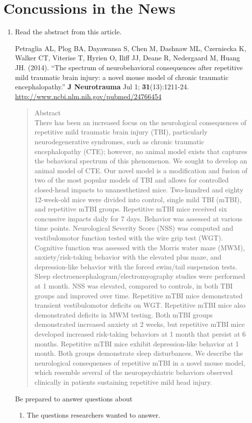 \def\theTopic{Reading 23 }

\section{ Concussions in the News}



\begin{enumerate}
\item   Read the abstract from this  article.

Petraglia AL, Plog BA, Dayawansa S, Chen M, Dashnaw ML, Czerniecka K,
Walker CT, Viterise T, Hyrien O, Iliff JJ, Deane R, Nedergaard M,
Huang JH. (2014). ``The spectrum of neurobehavioral consequences after repetitive mild traumatic brain injury: a novel mouse model of chronic traumatic encephalopathy.''
{\bf J Neurotrauma} Jul 1; {\bf 31}(13):1211-24. 
\url{http://www.ncbi.nlm.nih.gov/pubmed/24766454}
{\footnotesize
\begin{quotation}
Abstract\\
There has been an increased focus on the neurological consequences of
repetitive mild traumatic brain injury (TBI), particularly
neurodegenerative syndromes, such as chronic traumatic encephalopathy
(CTE); however, no animal model exists that captures the behavioral
spectrum of this phenomenon. We sought to develop an animal model of
CTE. Our novel model is a modification and fusion of two of the most
popular models of TBI and allows for controlled closed-head impacts to
unanesthetized mice. Two-hundred and eighty 12-week-old mice were
divided into control, single mild TBI (mTBI), and repetitive mTBI
groups. Repetitive mTBI mice received six concussive impacts daily for
7 days. Behavior was assessed at various time points. Neurological
Severity Score (NSS) was computed and vestibulomotor function tested
with the wire grip test (WGT). Cognitive function was assessed with
the Morris water maze (MWM), anxiety/risk-taking behavior with the
elevated plus maze, and depression-like behavior with the forced
swim/tail suspension tests. Sleep
electroencephalogram/electromyography studies were performed at 1
month. NSS was elevated, compared to controls, in both TBI groups and
improved over time. Repetitive mTBI mice demonstrated transient
vestibulomotor deficits on WGT. Repetitive mTBI mice also demonstrated
deficits in MWM testing. Both mTBI groups demonstrated increased
anxiety at 2 weeks, but repetitive mTBI mice developed increased
risk-taking behaviors at 1 month that persist at 6 months. Repetitive
mTBI mice exhibit depression-like behavior at 1 month. Both groups
demonstrate sleep disturbances. We describe the neurological consequenses
of repetitive mTBI in a novel mouse model, which resemble several of
the neuropsychiatric behaviors observed clinically in patients
sustaining repetitive mild head injury.
\end{quotation}
}
 Be prepared to answer questions about 
\begin{enumerate}
\item  The questions researchers wanted to answer.
\begin{students}
 \vspace{1in}
\end{students}


\end{enumerate}
\end{enumerate}
